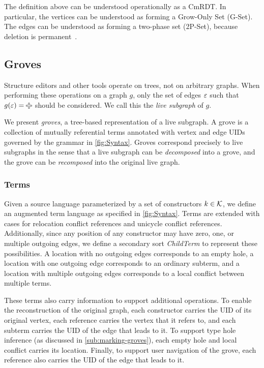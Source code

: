 The definition above can be understood operationally as a CmRDT. In particular, the vertices can be understood as forming a Grow-Only Set (G-Set). The edges can be understood as forming a two-phase set (2P-Set), because deletion is permanent~\cite{shapiro2011conflict}.

\subsection{Groves}%
\label{sub:Groves}

Structure editors and other tools operate on trees, not on arbitrary graphs. When performing these operations on a graph $g$, only the set of edges $\varepsilon$ such that $g(\e) = \Plus$ should be considered. We call this the \textit{live subgraph} of $g$.

We present \textit{groves}, a tree-based representation of a live subgraph. A grove is a collection of mutually referential terms annotated with vertex and edge UIDs governed by the grammar in \autoref{fig:Syntax}. Groves correspond precisely to live subgraphs in the sense that a live subgraph can be \emph{decomposed} into a grove, and the grove can be \emph{recomposed} into the original live graph.

\subsubsection{Terms}%
\label{subsub:Terms}

\figureTermSyntax

Given a source language parameterized by a set of constructors $k \in \mathcal{K}$, we define an augmented term language as specified in \autoref{fig:Syntax}. Terms are extended with cases for relocation conflict references and unicycle conflict references. Additionally, since any position of any constructor may have zero, one, or multiple outgoing edges, we define a secondary sort \textit{ChildTerm} to represent these possibilities. A location with no outgoing edges corresponds to an empty hole, a location with one outgoing edge corresponds to an ordinary subterm, and a location with multiple outgoing edges corresponds to a local conflict between multiple terms. 

These terms also carry information to support additional operations. To enable the reconstruction of the original graph, each constructor carries the UID of its original vertex, each reference carries the vertex that it refers to, and each subterm carries the UID of the edge that leads to it. To support type hole inference (as discussed in \autoref{sub:marking-groves}), each empty hole and local conflict carries its location. Finally, to support user navigation of the grove, each reference also carries the UID of the edge that leads to it. 

